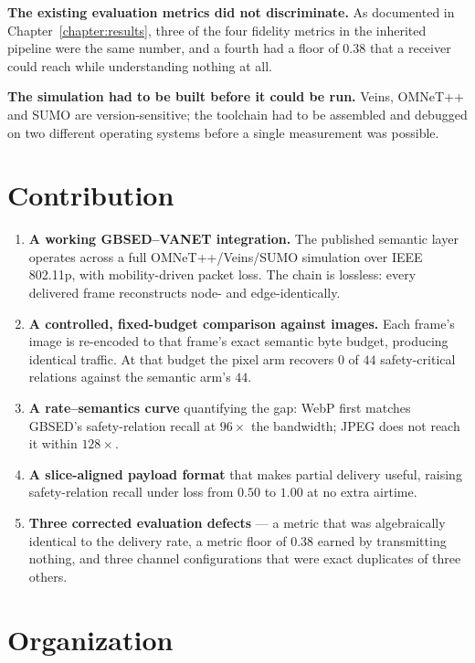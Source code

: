 \documentclass{iutbscthesis}
\begin{document}
\textbf{The existing evaluation metrics did not discriminate.} As documented in
Chapter~\ref{chapter:results}, three of the four fidelity metrics in the
inherited pipeline were the same number, and a fourth had a floor of $0.38$
that a receiver could reach while understanding nothing at all.

\textbf{The simulation had to be built before it could be run.} Veins, OMNeT++
and SUMO are version-sensitive; the toolchain had to be assembled and debugged
on two different operating systems before a single measurement was possible.

\section{Contribution}

\begin{enumerate}
    \item \textbf{A working GBSED--VANET integration.} The published semantic
    layer operates across a full OMNeT++/Veins/SUMO simulation over IEEE
    802.11p, with mobility-driven packet loss. The chain is lossless: every
    delivered frame reconstructs node- and edge-identically.

    \item \textbf{A controlled, fixed-budget comparison against images.} Each
    frame's image is re-encoded to that frame's exact semantic byte budget,
    producing identical traffic. At that budget the pixel arm recovers $0$ of
    $44$ safety-critical relations against the semantic arm's $44$.

    \item \textbf{A rate--semantics curve} quantifying the gap: WebP first
    matches GBSED's safety-relation recall at $96\times$ the bandwidth; JPEG
    does not reach it within $128\times$.

    \item \textbf{A slice-aligned payload format} that makes partial delivery
    useful, raising safety-relation recall under loss from $0.50$ to $1.00$ at
    no extra airtime.

    \item \textbf{Three corrected evaluation defects} --- a metric that was
    algebraically identical to the delivery rate, a metric floor of $0.38$
    earned by transmitting nothing, and three channel configurations that were
    exact duplicates of three others.
\end{enumerate}

\section{Organization}
\end{document}
